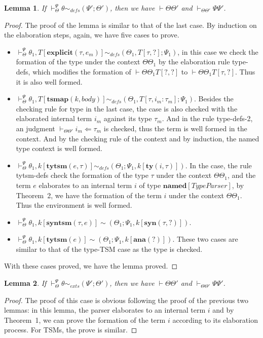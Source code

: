 \documentclass[letterpaper, notitlepage]{article}
\newtheorem{lemma}{Lemma}
\begin{document}
\begin{lemma}
If $\vdash_{\Theta}^{\Psi}\theta\sim_{defs}(\Psi';\Theta')$, then we have $\vdash\Theta\Theta'$ and $\vdash_{\Theta\Theta'}\Psi\Psi'$.
\end{lemma}
\begin{proof}
The proof of the lemma is similar to that of the last case. By induction on the elaboration steps, again, we have five cases to prove.
\begin{itemize}
	\item $\vdash_{\Theta}^{\Psi}\theta_1,T[\mathbf{explicit}(\tau,e_m)] \sim_{defs} (\Theta_1,T[\tau,?];\Psi_1)$, in this case we check the formation of the type under the context $\Theta\Theta_1$ by the elaboration rule type-defs, which modifies the formation of $\vdash{\Theta\Theta_1}T[?,?]$ to $\vdash{\Theta\Theta_1}T[\tau,?]$. Thus it is also well formed.
	\item  $\vdash_{\Theta}^{\Psi}\theta_1,T[\mathbf{tsmap}(k,body)] \sim_{defs} (\Theta_1,T[\tau,i_m:\tau_m];\Psi_1)$. Besides the checking rule for type in the last case, the case is also checked with the elaborated internal term $i_m$ against its type $\tau_m$. And in the rule type-defs-2, an judgment $\vdash_{\Theta\Theta'}i_m\Leftarrow\tau_m$ is checked, thus the term is well formed in the context. And by the checking rule of the context and by induction, the named type context is well formed.
	\item  $\vdash_{\Theta}^{\Psi}\theta_1,k[\mathbf{tytsm}(e,\tau)] \sim_{defs} (\Theta_1;\Psi_1,k[\mathbf{ty}(i,\tau)])$. In the case, the rule tytsm-defs check the formation of the type $\tau$ under the context $\Theta\Theta_1$, and the term $e$ elaborates to an internal term $i$ of type $\mathbf{named}[TypeParser]$, by Theorem~2, we have the formation of the term $i$ under the context $\Theta\Theta_1$. Thus the environment is well formed.
	\item $\vdash_{\Theta}^{\Psi}\theta_1,k[\mathbf{syntsm}(\tau,e)] \sim (\Theta_1;\Psi_1,k[\mathbf{syn}(\tau,?)])$.
	\item $\vdash_{\Theta}^{\Psi}\theta_1,k[\mathbf{tytsm}(e)] \sim (\Theta_1;\Psi_1,k[\mathbf{ana}(?)])$. These two cases are similar to that of the type-TSM case as the type is checked.
\end{itemize}
With these cases proved, we have the lemma proved.
\end{proof}

\begin{lemma}
If $\vdash_{\Theta}^{\Psi}\theta\sim_{exts}(\Psi';\Theta')$, then we have $\vdash\Theta\Theta'$ and $\vdash_{\Theta\Theta'}\Psi\Psi'$.
\end{lemma}
\begin{proof}
The proof of this case is obvious following the proof of the previous two lemmas: in this lemma, the parser elaborates to an internal term $i$ and by Theorem~1, we can prove the formation of the term $i$ according to its elaboration process. For TSMs, the prove is similar.
\end{proof}
\end{document}
